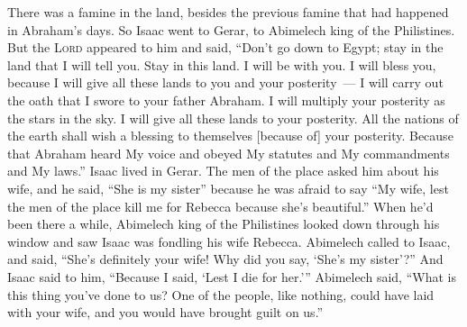 
\begin{inparaenum}
     There was a famine in the land, besides the previous famine that had happened in Abraham's days. So Isaac went to Gerar, to Abimelech king of the Philistines.%
     But the \textsc{Lord} appeared to him and said, ``Don't go down to Egypt; stay in the land that I will tell you.%
     Stay in this land. I will be with you. I will bless you, because I will give all these lands to you and your posterity~--- I will carry out the oath that I swore to your father Abraham.%
     I will multiply your posterity as the stars in the sky. I will give all these lands to your posterity. All the nations of the earth shall wish a blessing to themselves [because of] your posterity.%
     Because that Abraham heard My voice and obeyed My statutes and My commandments and My laws.''%
     Isaac lived in Gerar.%
     The men of the place asked him about his wife, and he said, ``She is my sister'' because he was afraid to say ``My wife, lest the men of the place kill me for Rebecca because she's beautiful.''%
     When he'd been there a while, Abimelech king of the Philistines looked down through his window and saw Isaac was fondling his wife Rebecca.%
     Abimelech called to Isaac, and said, ``She's definitely your wife! Why did you say, `She's my sister'?'' And Isaac said to him, ``Because I said, `Lest I die for her.'\thinspace''%
     Abimelech said, ``What is this thing you've done to us? One of the people, like nothing, could have laid with your wife, and you would have brought guilt on us.''%

\end{inparaenum}
